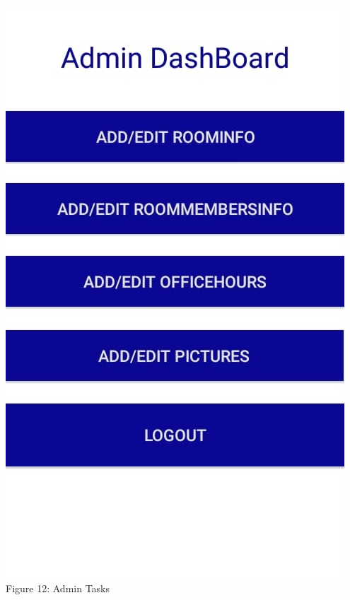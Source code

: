 \documentclass{article}
\begin{document}
\begin{center}
\includegraphics[scale=0.3]{f7}
\\Figure 12: Admin Tasks
\end{center}
\end{document}
